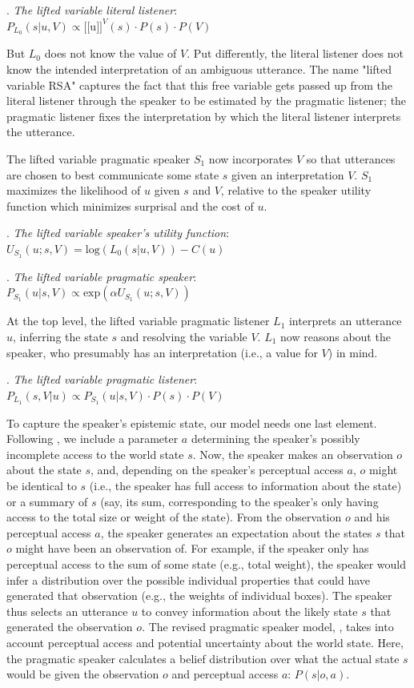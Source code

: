 \documentclass[linguex]{sp}
\newcommand{\sem}[1]{\mbox{$[\![$#1$]\!]$}}
\begin{document}
\ex. \emph{The lifted variable literal listener}:\\
$P_{L_{0}}(s|u,V) \propto \sem{u}^{V}(s) \cdot P(s) \cdot P(V)$

But $L_{0}$ does not know the value of $V$. Put differently, the literal listener does not know the intended interpretation of an ambiguous utterance. The name "lifted variable RSA" captures the fact that this free variable gets passed up from the literal listener through the speaker to be estimated by the pragmatic listener; the pragmatic listener fixes the interpretation by which the literal listener interprets the utterance.

The lifted variable pragmatic speaker $S_{1}$ now incorporates $V$ so that utterances are chosen to best communicate some state $s$ given an interpretation $V$. $S_{1}$ maximizes the likelihood of $u$ given $s$ and $V$, relative to the speaker utility function which minimizes surprisal and the cost of $u$.

\ex. \emph{The lifted variable speaker's utility function}:\\
$U_{S_{1}}(u;s,V) = \textrm{log}(L_{0}(s|u,V)) - C(u)$

\ex. \emph{The lifted variable pragmatic speaker}:\\
$P_{S_{1}}(u|s,V) \propto \textrm{exp}(\alpha U_{S_{1}}\!(u;s,V))$

At the top level, the lifted variable pragmatic listener $L_{1}$ interprets an utterance $u$, inferring the state $s$ and resolving the variable $V$. $L_{1}$ now reasons about the speaker, who presumably has an interpretation (i.e., a value for $V$) in mind.

\ex. \emph{The lifted variable pragmatic listener}:\\
$P_{L_{1}}(s,V|u) \propto P_{S_{1}}(u|s,V) \cdot P(s) \cdot P(V)$

To capture the speaker's epistemic state, our model needs one last element. Following \cite{goodmanstuhlmuller2013}, we include a parameter $a$ determining the speaker's possibly incomplete access to the world state $s$. Now, the speaker makes an observation $o$ about the state $s$, and, depending on the speaker's perceptual access $a$, $o$ might be identical to $s$ (i.e., the speaker has full access to information about the state) or a summary of $s$ (say, its sum, corresponding to the speaker's only having access to the total size or weight of the state). From the observation $o$ and his perceptual access $a$, the speaker generates an expectation about the states $s$ that $o$ might have been an observation of. For example, if the speaker only has perceptual access to the sum of some state (e.g., total weight), the speaker would infer a distribution over the possible individual properties that could have generated that observation (e.g., the weights of individual boxes). The speaker thus selects an utterance $u$ to convey information about the likely state $s$ that generated the observation $o$. The revised  pragmatic speaker model, \Next, takes into account perceptual access and potential uncertainty about the world state. Here, the pragmatic speaker calculates a belief distribution over what the actual state $s$ would be given the observation $o$ and perceptual access $a$: $P(s|o,a)$.
\end{document}
